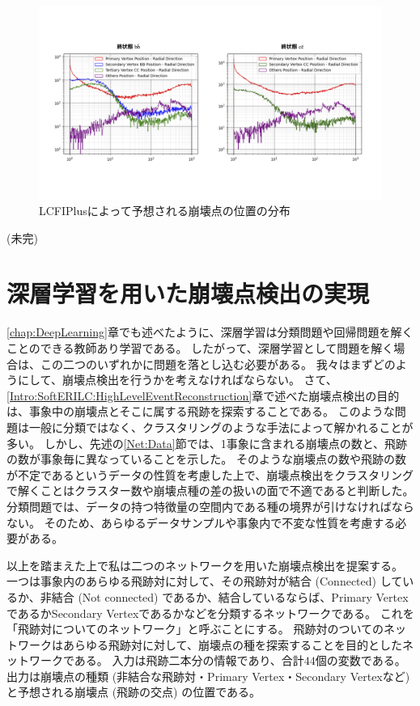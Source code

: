 \begin{figure}[h]
 \centering
 \includegraphics[width=1.0\textwidth]{Figure/3Networks/3-1-2-3VertexPositions.png}
 \caption{LCFIPlusによって予想される崩壊点の位置の分布}
 \label{3-1-2-3VertexPositions}
\end{figure}


(未完)

\section{深層学習を用いた崩壊点検出の実現} \label{Net:forVertexFinderwithDL}

\ref{chap:DeepLearning}章でも述べたように、深層学習は分類問題や回帰問題を解くことのできる教師あり学習である。
したがって、深層学習として問題を解く場合は、この二つのいずれかに問題を落とし込む必要がある。
我々はまずどのようにして、崩壊点検出を行うかを考えなければならない。
さて、\ref{Intro:SoftERILC:HighLevelEventReconstruction}章で述べた崩壊点検出の目的は、事象中の崩壊点とそこに属する飛跡を探索することである。
このような問題は一般に分類ではなく、クラスタリングのような手法によって解かれることが多い。
しかし、先述の\ref{Net:Data}節では、1事象に含まれる崩壊点の数と、飛跡の数が事象毎に異なっていることを示した。
そのような崩壊点の数や飛跡の数が不定であるというデータの性質を考慮した上で、崩壊点検出をクラスタリングで解くことはクラスター数や崩壊点種の差の扱いの面で不適であると判断した。
分類問題では、データの持つ特徴量の空間内である種の境界が引けなければならない。
そのため、あらゆるデータサンプルや事象内で不変な性質を考慮する必要がある。

以上を踏まえた上で私は二つのネットワークを用いた崩壊点検出を提案する。
一つは事象内のあらゆる飛跡対に対して、その飛跡対が結合 (Connected) しているか、非結合 (Not connected) であるか、結合しているならば、Primary VertexであるかSecondary Vertexであるかなどを分類するネットワークである。
これを「飛跡対についてのネットワーク」と呼ぶことにする。
飛跡対のついてのネットワークはあらゆる飛跡対に対して、崩壊点の種を探索することを目的としたネットワークである。
入力は飛跡二本分の情報であり、合計$44$個の変数である。
出力は崩壊点の種類 (非結合な飛跡対・Primary Vertex・Secondary Vertexなど) と予想される崩壊点 (飛跡の交点) の位置である。

